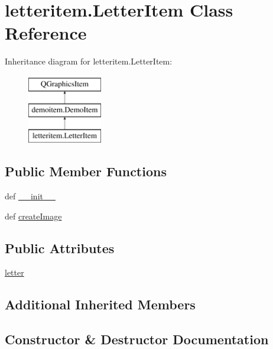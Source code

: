 \hypertarget{classletteritem_1_1LetterItem}{}\section{letteritem.\+Letter\+Item Class Reference}
\label{classletteritem_1_1LetterItem}
Inheritance diagram for letteritem.\+Letter\+Item\+:\begin{figure}[H]
\begin{center}
\leavevmode
\includegraphics[height=3.000000cm]{classletteritem_1_1LetterItem}
\end{center}
\end{figure}
\subsection*{Public Member Functions}
\begin{DoxyCompactItemize}
\item 
def \hyperlink{classletteritem_1_1LetterItem_a48c324a2d522fb605bc188ee0e336f96}{\+\_\+\+\_\+init\+\_\+\+\_\+}
\item 
def \hyperlink{classletteritem_1_1LetterItem_a1f42c273023d030fe97b61296e26157d}{create\+Image}
\end{DoxyCompactItemize}
\subsection*{Public Attributes}
\begin{DoxyCompactItemize}
\item 
\hyperlink{classletteritem_1_1LetterItem_a3aed90ef99c5f7b84cfb9883c756fdd9}{letter}
\end{DoxyCompactItemize}
\subsection*{Additional Inherited Members}


\subsection{Constructor \& Destructor Documentation}
\hypertarget{classletteritem_1_1LetterItem_a48c324a2d522fb605bc188ee0e336f96}{}
